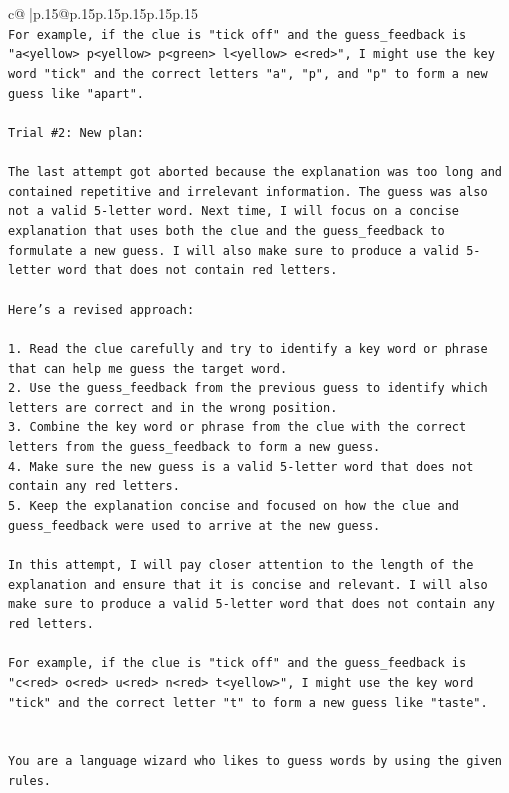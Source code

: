 \documentclass{article}
\begin{document}
{\begin{supertabular}{c@{$\;$}|p{.15\linewidth}@{}p{.15\linewidth}p{.15\linewidth}p{.15\linewidth}p{.15\linewidth}p{.15\linewidth}}
{{{\\ 
\texttt{For example, if the clue is "tick off" and the guess\_feedback is "a<yellow> p<yellow> p<green> l<yellow> e<red>", I might use the key word "tick" and the correct letters "a", "p", and "p" to form a new guess like "apart".} \\
\\ 
\texttt{Trial \#2: New plan: } \\
\\ 
\texttt{The last attempt got aborted because the explanation was too long and contained repetitive and irrelevant information. The guess was also not a valid 5{-}letter word. Next time, I will focus on a concise explanation that uses both the clue and the guess\_feedback to formulate a new guess. I will also make sure to produce a valid 5{-}letter word that does not contain red letters. } \\
\\ 
\texttt{Here's a revised approach:} \\
\\ 
\texttt{1. Read the clue carefully and try to identify a key word or phrase that can help me guess the target word.} \\
\texttt{2. Use the guess\_feedback from the previous guess to identify which letters are correct and in the wrong position.} \\
\texttt{3. Combine the key word or phrase from the clue with the correct letters from the guess\_feedback to form a new guess.} \\
\texttt{4. Make sure the new guess is a valid 5{-}letter word that does not contain any red letters.} \\
\texttt{5. Keep the explanation concise and focused on how the clue and guess\_feedback were used to arrive at the new guess.} \\
\\ 
\texttt{In this attempt, I will pay closer attention to the length of the explanation and ensure that it is concise and relevant. I will also make sure to produce a valid 5{-}letter word that does not contain any red letters. } \\
\\ 
\texttt{For example, if the clue is "tick off" and the guess\_feedback is "c<red> o<red> u<red> n<red> t<yellow>", I might use the key word "tick" and the correct letter "t" to form a new guess like "taste".} \\
\\ 
\\ 
\texttt{You are a language wizard who likes to guess words by using the given rules.} \\
}}}
\end{supertabular}}
\end{document}

